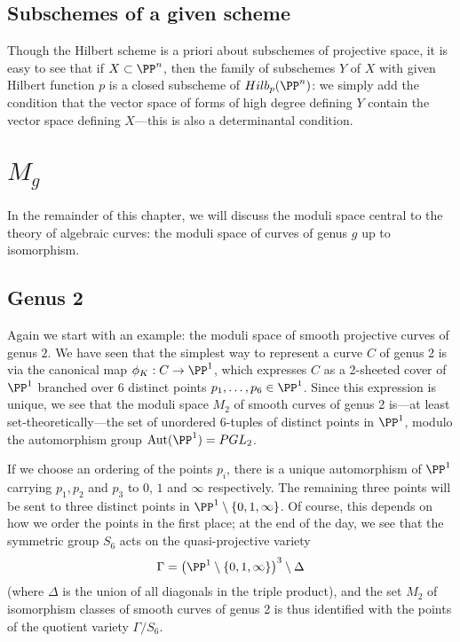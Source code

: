 
\subsection{Subschemes of a given scheme}

Though the Hilbert scheme is a priori about subschemes of projective space, it is easy to see that if $X\subset \PP^n$,
then the family of subschemes $Y$ of $X$ with given Hilbert function $p$ is a closed subscheme of $Hilb_p(\PP^n)$: we simply
add the condition that the vector space of forms of high degree defining $Y$  contain the vector space defining $X$---this is also a determinantal condition.

\section{$M_g$}

In the remainder of this chapter, we will discuss the moduli space central to the theory of algebraic curves: the moduli space of curves of genus $g$ up to isomorphism.

\subsection{Genus 2}                                                                                             

Again we start with an example: the moduli space of smooth projective curves of genus $2$. We have seen that the simplest way to represent a curve $C$ of genus 2 is via the canonical map $\phi_K : C \to \PP^1$, which expresses $C$ as a 2-sheeted cover of $\PP^1$ branched over 6 distinct points $p_1,\dots,p_6 \in \PP^1$. Since this expression is unique, we see that the moduli space $M_2$ of smooth curves of genus 2 is---at least set-theoretically---the set of unordered 6-tuples of distinct points in $\PP^1$, modulo the automorphism group ${\rm Aut}(\PP^1) = PGL_2$.

 If we choose an ordering of the points $p_i$, there is a unique automorphism of $\PP^1$ carrying $p_1, p_2$ and $p_3$ to $0$, $1$ and $\infty$ respectively.  The remaining three points will be sent to three distinct points in $\PP^1 \setminus \{0, 1, \infty \} $. Of course, this depends on how we order the points in the first place; at the end of the day, we see that the symmetric group $S_6$ acts on the quasi-projective variety
$$
\Gamma = \left( \PP^1 \setminus \{0, 1, \infty \} \right)^3 \setminus \Delta
$$
(where $\Delta$ is the union of all diagonals in the triple product), and the set $M_2$ of isomorphism classes of smooth curves of genus 2 is thus identified with the points of the quotient variety $\Gamma/S_6$.

